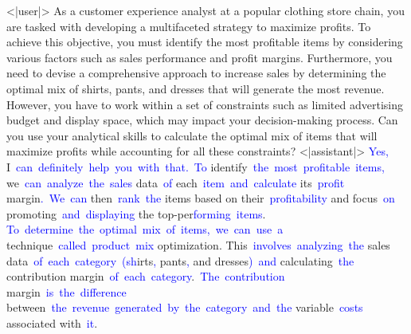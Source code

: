 \documentclass{article}
\begin{document}
\begin{tcolorbox}[colframe=black,colback=white]
<|user|>
As a customer experience analyst at a popular clothing store chain, you are tasked with developing a multifaceted strategy to maximize profits. To achieve this objective, you must identify the most profitable items by considering various factors such as sales performance and profit margins. Furthermore, you need to devise a comprehensive approach to increase sales by determining the optimal mix of shirts, pants, and dresses that will generate the most revenue. However, you have to work within a set of constraints such as limited advertising budget and display space, which may impact your decision-making process. Can you use your analytical skills to calculate the optimal mix of items that will maximize profits while accounting for all these constraints?
<|assistant|>
\textcolor{blue}{Yes}\textcolor{blue}{,} I\textcolor{blue}{~can}\textcolor{blue}{~definitely}\textcolor{blue}{~help}\textcolor{blue}{~you}\textcolor{blue}{~with}\textcolor{blue}{~that}\textcolor{blue}{.}\textcolor{blue}{~To} identify\textcolor{blue}{~the}\textcolor{blue}{~most}\textcolor{blue}{~profitable}\textcolor{blue}{~items}\textcolor{blue}{,} we\textcolor{blue}{~can}\textcolor{blue}{~analyze}\textcolor{blue}{~the}\textcolor{blue}{~sales} data\textcolor{blue}{~of} each\textcolor{blue}{~item}\textcolor{blue}{~and}\textcolor{blue}{~calculate} its\textcolor{blue}{~profit} margin\textcolor{blue}{.}\textcolor{blue}{~We}\textcolor{blue}{~can} then\textcolor{blue}{~rank}\textcolor{blue}{~the} items based on their\textcolor{blue}{~profitability} and focus\textcolor{blue}{~on} promoting\textcolor{blue}{~and}\textcolor{blue}{~displaying} the top-per\textcolor{blue}{forming}\textcolor{blue}{~items}.
\textcolor{blue}{To}\textcolor{blue}{~determine}\textcolor{blue}{~the}\textcolor{blue}{~optimal}\textcolor{blue}{~mix}\textcolor{blue}{~of}\textcolor{blue}{~items}\textcolor{blue}{,}\textcolor{blue}{~we}\textcolor{blue}{~can}\textcolor{blue}{~use}\textcolor{blue}{~a} technique\textcolor{blue}{~called}\textcolor{blue}{~product}\textcolor{blue}{~mix} optimization. This\textcolor{blue}{~involves}\textcolor{blue}{~analyzing}\textcolor{blue}{~the} sales data\textcolor{blue}{~of}\textcolor{blue}{~each}\textcolor{blue}{~category}\textcolor{blue}{~(}\textcolor{blue}{sh}irts\textcolor{blue}{,} pants\textcolor{blue}{,} and dresses\textcolor{blue}{)}\textcolor{blue}{~and} calculating\textcolor{blue}{~the} contribution margin\textcolor{blue}{~of}\textcolor{blue}{~each}\textcolor{blue}{~category}.\textcolor{blue}{~The}\textcolor{blue}{~contribution} margin\textcolor{blue}{~is}\textcolor{blue}{~the}\textcolor{blue}{~difference} between\textcolor{blue}{~the}\textcolor{blue}{~revenue}\textcolor{blue}{~generated}\textcolor{blue}{~by}\textcolor{blue}{~the}\textcolor{blue}{~category}\textcolor{blue}{~and}\textcolor{blue}{~the} variable\textcolor{blue}{~costs} associated with\textcolor{blue}{~it}.\textcolor{blue}{~
}
\end{tcolorbox}
\end{document}
